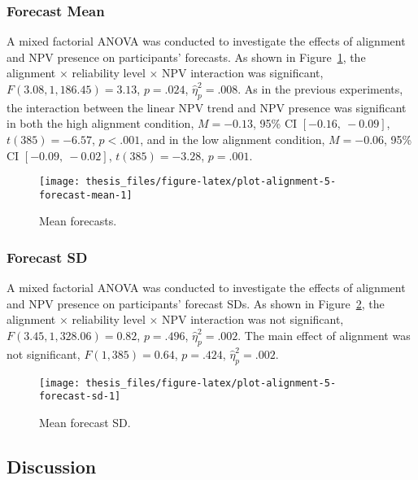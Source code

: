 \documentclass[a4paper, nobind]{templates/ociamthesis}
\theoremstyle{definition}
\theoremstyle{definition}
\theoremstyle{definition}
\theoremstyle{definition}
\theoremstyle{remark}
\begin{document}
\subsubsection{Forecast Mean}

A mixed factorial ANOVA was conducted to investigate the effects of alignment
and NPV presence on participants' forecasts. As shown in
Figure~\ref{fig:plot-alignment-5-forecast-mean}, the alignment \(\times\)
reliability level \(\times\) NPV interaction was significant,
\(F(3.08, 1,186.45) = 3.13\), \(p = .024\), \(\hat{\eta}^2_p = .008\).
As in the previous experiments, the interaction between the linear
NPV trend and NPV presence was significant in both the high alignment condition,
\(M = -0.13\), 95\% CI \([-0.16,~-0.09]\), \(t(385) = -6.57\), \(p < .001\), and in the
low alignment condition,
\(M = -0.06\), 95\% CI \([-0.09,~-0.02]\), \(t(385) = -3.28\), \(p = .001\).



\begin{figure}
\texttt{[image: thesis\_files/figure-latex/plot-alignment-5-forecast-mean-1]} \caption{Mean forecasts.}\label{fig:plot-alignment-5-forecast-mean}
\end{figure}

\hypertarget{forecast-sd-alignment-5}{%
\subsubsection{Forecast SD}\label{forecast-sd-alignment-5}}

A mixed factorial ANOVA was conducted to investigate the effects of alignment
and NPV presence on participants' forecast SDs. As shown in
Figure~\ref{fig:plot-alignment-5-forecast-sd}, the alignment \(\times\)
reliability level \(\times\) NPV interaction was not significant,
\(F(3.45, 1,328.06) = 0.82\), \(p = .496\), \(\hat{\eta}^2_p = .002\). The
main effect of alignment was not significant,
\(F(1, 385) = 0.64\), \(p = .424\), \(\hat{\eta}^2_p = .002\).



\begin{figure}
\texttt{[image: thesis\_files/figure-latex/plot-alignment-5-forecast-sd-1]} \caption{Mean forecast SD.}\label{fig:plot-alignment-5-forecast-sd}
\end{figure}

\subsection{Discussion}
\end{document}

